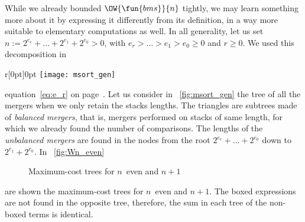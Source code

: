 While we already bounded \(\OW{\fun{bms}}{n}\) tightly, we may learn
something more about it by expressing it differently from its
definition, in a way more suitable to elementary computations as well.
In all generality, let us set \(n := 2^{e_r} + \dots + 2^{e_1} +
2^{e_0} > 0\), with \(e_r > \dots > e_1 > e_0 \geqslant 0\) and \(r
\geqslant 0\).  We used this decomposition in
\begin{wrapfigure}[9]{r}[0pt]{0pt}
\centering
\texttt{[image: msort\_gen]}
\caption{\(\sum_{j=0}^{r}2^{e_j}\) keys}
\label{fig:msort_gen}
\end{wrapfigure}
equation~\eqref{eq:e_r} on page~\pageref{eq:e_r}. Let us consider in
\fig~\ref{fig:msort_gen} the tree of all
the mergers when we only retain the stacks lengths. The triangles are
subtrees made of \emph{balanced mergers}, that is, mergers performed
on stacks of same length, for which we already found the number of
comparisons. The lengths of the \emph{unbalanced mergers} are found in
the nodes from the root \(2^{e_r}+ \dots + 2^{e_0}\) down to \(2^{e_1}
+ 2^{e_0}\). In \fig~\vref{fig:Wn_even}
\begin{figure}
\centering
{}
\qquad
{}
\caption{Maximum-cost trees for \(n\)~even and \(n+1\)}
\label{fig:Wn_even}
\end{figure}
are shown the maximum\hyp{}cost trees for \(n\)~even and \(n+1\). The
boxed expressions are not found in the opposite tree, therefore, the
sum in each tree of the non\hyp{}boxed terms is identical.
